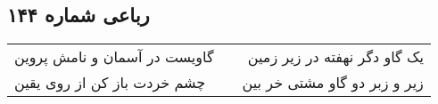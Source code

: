 \begin{center}
\section*{رباعی شماره ۱۴۴}
\label{sec:sh144}
\begin{longtable}{l p{0.5cm} r}
گاویست در آسمان و نامش پروین
&&
یک گاو دگر نهفته در زیر زمین
\\
چشم خردت باز کن از روی یقین
&&
زیر و زبر دو گاو مشتی خر بین
\\
\end{longtable}
\end{center}
